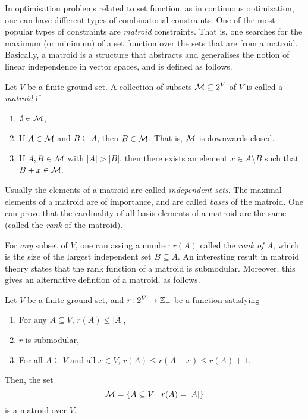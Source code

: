 In optimisation problems related to set function, as in continuous optimisation, one can have different types of combinatorial constraints. One of the most popular types of constraints are \emph{matroid} constraints. That is, one searches for the maximum (or minimum) of a set function over the sets that are from a matroid. Basically, a matroid is a structure that abstracts and generalises the notion of linear independence in vector spaces, and is defined as follows.

\begin{definition}[Matroid]
    Let $V$ be a finite ground set. A collection of subsets $\mathcal{M} \subseteq 2^V$ of $V$ is called a \emph{matroid} if 
    \begin{enumerate}
        \item $\emptyset \in \mathcal{M}$,
        \item If $A\in\mathcal{M}$ and $B \subseteq A$, then $B \in \mathcal{M}$. That is, $\mathcal{M}$ is downwards closed.
        \item If $A, B\in\mathcal{M}$ with $|A| > |B|$, then there exists an element $x\in A\setminus B$ such that $B + x \in \mathcal{M}$.
    \end{enumerate}
\end{definition}
Usually the elements of a matroid are called \emph{independent sets}. The maximal elements of a matroid are of importance, and are called \emph{bases} of the matroid. One can prove that the cardinality of all basis elements of a matroid are the same (called the \emph{rank} of the matroid).

For \emph{any} subset of $V$, one can assing a number $r(A)$ called the \emph{rank of $A$}, which is the size of the largest independent set $B\subseteq A$. An interesting result in matroid theory states that the rank function of a matroid is submodular. Moreover, this gives an alternative defintion of a matroid, as follows.

\begin{definition} Let $V$ be a finite ground set, and $r\colon 2^V\to \mathbb{Z}_+$ be a function satisfying
    \begin{enumerate}
        \item For any $A\subseteq V$, $r(A) \leq |A|$,
        \item $r$ is submodular,
        \item For all $A\subseteq V$ and all $x\in V$, $r(A) \leq r(A+x) \leq r(A) + 1$.
    \end{enumerate}
    Then, the set 
    \[
        \mathcal{M} = \{ A\subseteq V \mid r(A) = |A|\}
    \]
    is a matroid over $V$.
\end{definition}

